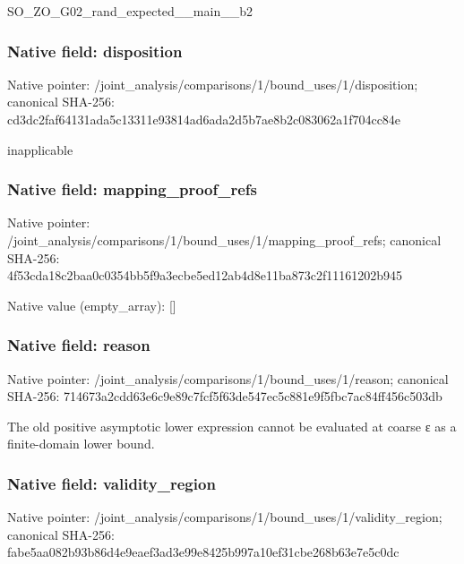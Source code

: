 \documentclass[10pt,a4paper]{article}
\begin{document}
\begingroup\raggedright\sloppy SO\_\allowbreak{}ZO\_\allowbreak{}G02\_\allowbreak{}rand\_\allowbreak{}expected\_\allowbreak{}\_\allowbreak{}main\_\allowbreak{}\_\allowbreak{}b2\par\endgroup

\subsubsection{Native field: disposition}
Native pointer: /joint\_\allowbreak{}analysis/comparisons/1/bound\_\allowbreak{}uses/1/disposition; canonical SHA-256: cd3dc2faf64131ada5c13311e93814ad6ada2d5b7ae8b2c083062a1f704cc84e

\begingroup\raggedright\sloppy inapplicable\par\endgroup

\subsubsection{Native field: mapping\_\allowbreak{}proof\_\allowbreak{}refs}
Native pointer: /joint\_\allowbreak{}analysis/comparisons/1/bound\_\allowbreak{}uses/1/mapping\_\allowbreak{}proof\_\allowbreak{}refs; canonical SHA-256: 4f53cda18c2baa0c0354bb5f9a3ecbe5ed12ab4d8e11ba873c2f11161202b945

Native value (empty\_\allowbreak{}array): []

\subsubsection{Native field: reason}
Native pointer: /joint\_\allowbreak{}analysis/comparisons/1/bound\_\allowbreak{}uses/1/reason; canonical SHA-256: 714673a2cdd63e6c9e89c7fcf5f63de547ec5c881e9f5fbc7ac84ff456c503db

\begingroup\raggedright\sloppy The old positive asymptotic lower expression cannot be evaluated at coarse {\AtlasUnicodeText ε}\allowbreak{} as a finite-domain lower bound.\par\endgroup

\subsubsection{Native field: validity\_\allowbreak{}region}
Native pointer: /joint\_\allowbreak{}analysis/comparisons/1/bound\_\allowbreak{}uses/1/validity\_\allowbreak{}region; canonical SHA-256: fabe5aa082b93b86d4e9eaef3ad3e99e8425b997a10ef31cbe268b63e7e5c0dc
\end{document}
